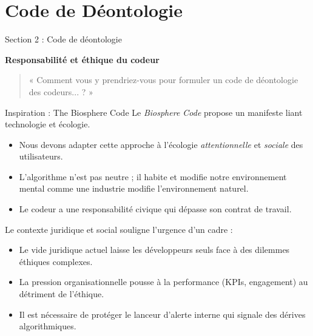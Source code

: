 \documentclass[9pt, aspectratio=169]{beamer}
\begin{document}
\section{Code de Déontologie}

\begin{frame}{Section 2 : Code de déontologie}
    \begin{center}
        \Large \textbf{Responsabilité et éthique du codeur}
    \end{center}
    \vspace{1cm}
    \begin{quote}
        « Comment vous y prendriez-vous pour formuler un code de déontologie des codeurs... ? »
    \end{quote}
\end{frame}

\begin{frame}{Inspiration : The Biosphere Code}
    Le \textit{Biosphere Code} \parencite{Biosphere2015} propose un manifeste liant technologie et écologie.
    \begin{itemize}
        \item Nous devons adapter cette approche à l'écologie \textit{attentionnelle} et \textit{sociale} des utilisateurs.
        \item L'algorithme n'est pas neutre ; il habite et modifie notre environnement mental comme une industrie modifie l'environnement naturel.
        \item Le codeur a une responsabilité civique qui dépasse son contrat de travail.
    \end{itemize}
\end{frame}

\begin{frame}{Le contexte juridique et social}
    \cite{NeuerPoint} souligne l'urgence d'un cadre :
    \begin{itemize}
        \item Le vide juridique actuel laisse les développeurs seuls face à des dilemmes éthiques complexes.
        \item La pression organisationnelle pousse à la performance (KPIs, engagement) au détriment de l'éthique.
        \item Il est nécessaire de protéger le lanceur d'alerte interne qui signale des dérives algorithmiques.
    \end{itemize}
\end{frame}
\end{document}
